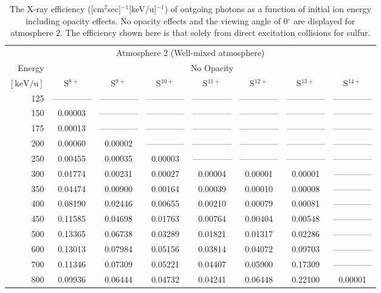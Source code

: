 \begin{table}[ht]
    \centering
    \caption{The X-ray efficiency ([cm$^2$sec]$^{-1}$[keV/u]$^{-1}$) of outgoing photons as a function of initial ion energy including opacity effects. No opacity effects and the viewing angle of 0$^\circ$ are displayed for atmosphere 2. The efficiency shown here is that solely from direct excitation collisions for sulfur.}
    \begin{tabular}{r|c|c|c|c|c|c|c}
    \multicolumn{8}{c}{Atmosphere 2 (Well-mixed atmosphere)} \\ \cline{2-8}
    Energy & \multicolumn{7}{c}{No Opacity} \\ \cline{2-8}
    $\mathrm{[keV/u]}$ & S$^{8+}$ & S$^{9+}$ & S$^{10+}$ & S$^{11+}$ & S$^{12+}$ & S$^{13+}$ & S$^{14+}$ \\ \cline{1-8}
      125 & -------------- & -------------- & -------------- & -------------- & -------------- & -------------- & -------------- \\ 
      150 & 0.00003 & -------------- & -------------- & -------------- & -------------- & -------------- & -------------- \\
      175 & 0.00013 & -------------- & -------------- & -------------- & -------------- & -------------- & -------------- \\
      200 & 0.00060 & 0.00002 & -------------- & -------------- & -------------- & -------------- & -------------- \\
      250 & 0.00455 & 0.00035 & 0.00003 & -------------- & -------------- & -------------- & -------------- \\
      300 & 0.01774 & 0.00231 & 0.00027 & 0.00004 & 0.00001 & 0.00001 & -------------- \\
      350 & 0.04474 & 0.00900 & 0.00164 & 0.00039 & 0.00010 & 0.00008 & -------------- \\
      400 & 0.08190 & 0.02446 & 0.00655 & 0.00210 & 0.00079 & 0.00081 & -------------- \\
      450 & 0.11585 & 0.04698 & 0.01763 & 0.00764 & 0.00404 & 0.00548 & -------------- \\
      500 & 0.13365 & 0.06738 & 0.03289 & 0.01821 & 0.01317 & 0.02286 & -------------- \\
      600 & 0.13013 & 0.07984 & 0.05156 & 0.03814 & 0.04072 & 0.09703 & -------------- \\
      700 & 0.11346 & 0.07309 & 0.05221 & 0.04407 & 0.05900 & 0.17309 & -------------- \\
      800 & 0.09936 & 0.06444 & 0.04732 & 0.04241 & 0.06448 & 0.22100 & 0.00001 \\

\end{tabular}
\end{table}
